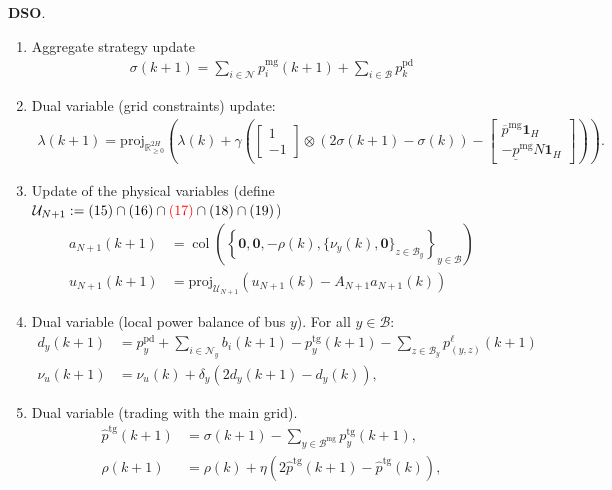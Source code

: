 \documentclass[10pt]{article}
\newcommand{\mc}{\mathcal}
\newcommand{\bb}{\mathbb}
\newcommand{\R}{\bb R}
\newcommand{\red}{\textcolor{red}}
\newcommand{\proj}{\mathrm{proj}}
\newcommand{\col}{\operatorname{col}}
\newcommand{\0}{\mathbf{0}}
\newcommand{\1}{\mathbf{1}}
\begin{document}
\bigskip
\textbf{DSO}.	
	\begin{enumerate}[(1)]
	\item Aggregate strategy update
	 \begin{align*}
	 \sigma(k+1) = \sum_{i \in \mc N} p_i^{\text{mg}}(k+1) + \sum_{i \in \mc B} p^{\text{pd}}_{k}
	 \end{align*}	

	\smallskip	
	\item Dual variable (grid constraints) update:
	\vspace*{-.5em}
	\begin{align*}
	\lambda(k+1) = \textstyle
	\proj_{\R^{2 H}_{\geq 0}}\left( 
	\lambda(k) + \gamma \left( 
	\left[
	\begin{smallmatrix}
	1\\
	- 1 
	\end{smallmatrix}
	\right] \otimes (2 \sigma(k+1)- \sigma(k)) 
	-
	\left[
	\begin{smallmatrix}
	\overline{p}^{\mathrm{mg}}\1_{H} \\
	-     \underline{p}^{\mathrm{mg}}N \1_{H}
	\end{smallmatrix} 
	\right]  
	\right)
	\right).
	\end{align*}


	 \smallskip
	 \item Update of the physical variables (define $\mc U_{N+1}:= (15) \cap (16) \cap \red{(17)} \cap (18) \cap (19)$)
	\begin{align*}
	a_{N+1}(k+1) &= \col \left( 
	\left\{
	\0,\0,-\rho(k), 
	\{ \nu_y(k), \0 \}_{z \in \mc B_y}
	\right\}_{y \in \mc B}
	\right)\\
	u_{N+1}(k+1) &= \proj_{\mc U_{N+1}}  \left( u_{N+1}(k) - A_{N+1} a_{N+1}(k) \right)
	\end{align*}
	 
	 
	 \smallskip
	 \item Dual variable (local power balance of bus $y$). For all $y \in \mc B$: 
	\begin{align*}
	d_y(k+1)   &= p_y^{\text{pd}} + \sum_{i \in \mc N_y} b_i(k+1)- p^{\text{tg}}_y(k+1) - \sum_{z \in \mc B_y} p^\ell_{(y,z)} (k+1)\\
	\nu_u(k+1) &= \nu_u(k) + \delta_y (2d_y(k+1)-d_y(k)),
	\end{align*}	 
	
		 \smallskip
	 \item Dual variable (trading with the main grid). 
	\begin{align*}
	\hat p^{\text{tg}}(k+1) &= \sigma(k+1)- \sum_{y \in \mc B^{\text{mg}}} p_y^{\text{tg}}(k+1),\\
	\rho(k+1) &= \rho(k) + \eta (2\hat p^{\text{tg}}(k+1)-\hat p^{\text{tg}}(k)),
	\end{align*}	 
	 

\end{enumerate}
\end{document}
